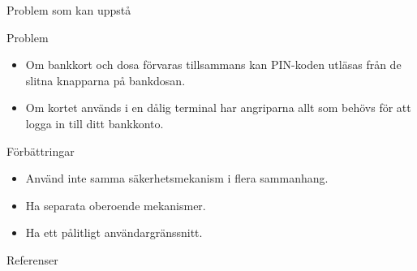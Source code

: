 \documentclass{beamer}
\theoremstyle{definition}
\theoremstyle{remark}
\begin{document}
\begin{frame}{\insertsubsectionhead}{Problem som kan uppstå}
  \begin{block}{Problem}
    \begin{itemize}
      \item Om bankkort och dosa förvaras tillsammans kan PIN-koden utläsas 
        från de slitna knapparna på bankdosan.
      \item Om kortet används i en dålig terminal har angriparna allt som 
        behövs för att logga in till ditt bankkonto.
    \end{itemize}
  \end{block}
  \begin{block}{Förbättringar}
    \begin{itemize}
      \item Använd inte samma säkerhetsmekanism i flera sammanhang.
      \item Ha separata oberoende mekanismer.
      \item Ha ett pålitligt användargränssnitt.
    \end{itemize}
  \end{block}
\end{frame}




\begin{frame}{Referenser}
	\small
  \printbibliography{}
\end{frame}
\end{document}
